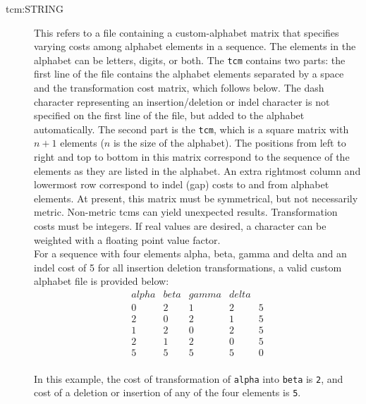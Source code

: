 \begin{description}
		\item [tcm:STRING] This refers to a file containing a custom-alphabet matrix that 
		specifies varying costs among alphabet elements in a sequence. The elements in 
		the alphabet can be letters, digits, or both.
		The \texttt{tcm} contains two parts: the first line of the file contains the alphabet elements 
		separated by a space and the transformation cost matrix, which follows below. The dash 
		character representing an insertion/deletion or indel character is not specified on the first 
		line of the file, but added to the alphabet automatically. The second part is the \texttt{tcm}, 
		which is a square matrix with $n + 1$ elements ($n$ is the size of the alphabet). 
		The positions from left to right and top to bottom in this matrix correspond to the sequence 
		of the elements as they are listed in the alphabet. An extra rightmost column and lowermost
		row correspond to indel (gap) costs to and from alphabet elements. At present, this matrix 
		must be symmetrical, but not necessarily metric. Non-metric tcms can yield unexpected 
		results. Transformation costs must be integers. If real values are desired, a character can 
		be weighted with a floating point value factor. \\
		
		For a sequence with four elements alpha, beta, gamma and delta and an indel cost of 5 
		for all insertion deletion transformations, a valid custom alphabet file is provided below:
		\\
		\begin{equation*}
		\begin{array}{lllll}
		alpha & beta & gamma & delta &  \\
		0 &   2 &  1 &   2 &   5 \\
		2 &   0 &  2 &   1 &   5 \\
		1 &   2 &  0 &   2 &   5 \\
		2 &   1 &  2 &   0 &   5 \\
		5 &   5 &  5 &   5 &   0
		\end{array}
		\end{equation*} 
		\\
		In this example, the cost of transformation of \texttt{alpha} into \texttt{beta} is \texttt{2},
		and cost of a deletion or insertion of any of the four elements is \texttt{5}.


\end{description}
